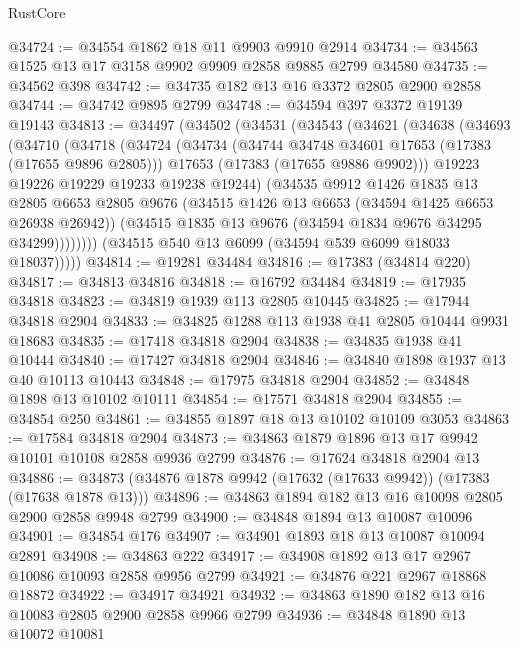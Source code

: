 \begin{lexlean}{RustCore}
\begin{coremodule}
@34724 := @34554 @1862 @18 @11 @9903 @9910 @2914
@34734 := @34563 @1525 @13 @17 @3158 @9902 @9909 @2858 @9885 @2799 @34580
@34735 := @34562 @398
@34742 := @34735 @182 @13 @16 @3372 @2805 @2900 @2858
@34744 := @34742 @9895 @2799
@34748 := @34594 @397 @3372 @19139 @19143
@34813 := @34497
    (@34502
      (@34531
        (@34543
          (@34621
            (@34638
              (@34693
                (@34710
                  (@34718
                    (@34724
                      (@34734
                        (@34744 @34748 @34601 @17653 (@17383 (@17655 @9896 @2805)))
                        @17653
                        (@17383 (@17655 @9886 @9902)))
                      @19223
                      @19226
                      @19229
                      @19233
                      @19238
                      @19244)
                    (@34535
                      @9912
                      @1426
                      @1835
                      @13
                      @2805
                      @6653
                      @2805
                      @9676
                      (@34515 @1426 @13 @6653 (@34594 @1425 @6653 @26938 @26942))
                      (@34515 @1835 @13 @9676 (@34594 @1834 @9676 @34295 @34299))))))))
          (@34515 @540 @13 @6099 (@34594 @539 @6099 @18033 @18037)))))
@34814 := @19281 @34484
@34816 := @17383 (@34814 @220)
@34817 := @34813 @34816
@34818 := @16792 @34484
@34819 := @17935 @34818
@34823 := @34819 @1939 @113 @2805 @10445
@34825 := @17944 @34818 @2904
@34833 := @34825 @1288 @113 @1938 @41 @2805 @10444 @9931 @18683
@34835 := @17418 @34818 @2904
@34838 := @34835 @1938 @41 @10444
@34840 := @17427 @34818 @2904
@34846 := @34840 @1898 @1937 @13 @40 @10113 @10443
@34848 := @17975 @34818 @2904
@34852 := @34848 @1898 @13 @10102 @10111
@34854 := @17571 @34818 @2904
@34855 := @34854 @250
@34861 := @34855 @1897 @18 @13 @10102 @10109 @3053
@34863 := @17584 @34818 @2904
@34873 := @34863 @1879 @1896 @13 @17 @9942 @10101 @10108 @2858 @9936 @2799
@34876 := @17624 @34818 @2904 @13
@34886 := @34873 (@34876 @1878 @9942 (@17632 (@17633 @9942)) (@17383 (@17638 @1878 @13)))
@34896 := @34863 @1894 @182 @13 @16 @10098 @2805 @2900 @2858 @9948 @2799
@34900 := @34848 @1894 @13 @10087 @10096
@34901 := @34854 @176
@34907 := @34901 @1893 @18 @13 @10087 @10094 @2891
@34908 := @34863 @222
@34917 := @34908 @1892 @13 @17 @2967 @10086 @10093 @2858 @9956 @2799
@34921 := @34876 @221 @2967 @18868 @18872
@34922 := @34917 @34921
@34932 := @34863 @1890 @182 @13 @16 @10083 @2805 @2900 @2858 @9966 @2799
@34936 := @34848 @1890 @13 @10072 @10081

\end{coremodule}
\end{lexlean}
